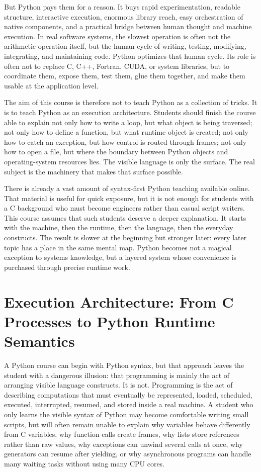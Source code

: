 \documentclass[a4paper,twoside]{report}
\begin{document}
But Python pays them for a reason. It buys rapid experimentation, readable structure, interactive execution, enormous library reach, easy orchestration of native components, and a practical bridge between human thought and machine execution. In real software systems, the slowest operation is often not the arithmetic operation itself, but the human cycle of writing, testing, modifying, integrating, and maintaining code. Python optimizes that human cycle. Its role is often not to replace C, C++, Fortran, CUDA, or system libraries, but to coordinate them, expose them, test them, glue them together, and make them usable at the application level.

The aim of this course is therefore not to teach Python as a collection of tricks. It is to teach Python as an execution architecture. Students should finish the course able to explain not only how to write a loop, but what object is being traversed; not only how to define a function, but what runtime object is created; not only how to catch an exception, but how control is routed through frames; not only how to open a file, but where the boundary between Python objects and operating-system resources lies. The visible language is only the surface. The real subject is the machinery that makes that surface possible.

There is already a vast amount of syntax-first Python teaching available online. That material is useful for quick exposure, but it is not enough for students with a C background who must become engineers rather than casual script writers. This course assumes that such students deserve a deeper explanation. It starts with the machine, then the runtime, then the language, then the everyday constructs. The result is slower at the beginning but stronger later: every later topic has a place in the same mental map. Python becomes not a magical exception to systems knowledge, but a layered system whose convenience is purchased through precise runtime work.

\chapter{Execution Architecture: From C Processes to Python Runtime Semantics}

A Python course can begin with Python syntax, but that approach leaves the student with a dangerous illusion: that programming is mainly the act of arranging visible language constructs. It is not. Programming is the act of describing computations that must eventually be represented, loaded, scheduled, executed, interrupted, resumed, and stored inside a real machine. A student who only learns the visible syntax of Python may become comfortable writing small scripts, but will often remain unable to explain why variables behave differently from C variables, why function calls create frames, why lists store references rather than raw values, why exceptions can unwind several calls at once, why generators can resume after yielding, or why asynchronous programs can handle many waiting tasks without using many CPU cores.
\end{document}
